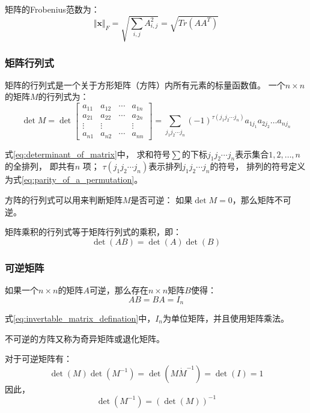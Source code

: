 矩阵的Frobenius范数为：
\begin{equation}
    \label{eq:frobenius_norm}
    \Vert \bm{x} \Vert_{F} =\sqrt{\sum_{i,j}A_{i,j}^{2}}=\sqrt{Tr(AA^{T})}
\end{equation}

\subsubsection{矩阵行列式}
矩阵的行列式是一个关于方形矩阵（方阵）内所有元素的标量函数值。
一个{$n\times n$}的矩阵{$M$}的行列式为：
\begin{equation}
    \label{eq:determinant_of_matrix}
    \det M =\det
    \begin{bmatrix}
        a_{11}&a_{12}&\cdots &a_{1n} \\
        a_{21}&a_{22}&\cdots &a_{2n} \\
        \vdots & \vdots & & \vdots \\
        a_{n1}&a_{n2}&\cdots &a_{nn}
    \end{bmatrix}
    =\sum_{j_1j_2\cdots j_n}{(-1)}^{\tau (j_1j_2\cdots j_n)}a_{1j_1}a_{2j_2}\ldots a_{nj_n}
\end{equation}

式{\ref{eq:determinant_of_matrix}}中，
求和符号{$\sum $}的下标{$j_1j_2\cdots j_n$}表示集合{$1,2,\ldots ,n$}的全排列，
即共有{$n\!$} 项；
{$\tau({j_1j_2\cdots j_n})$}表示排列{$j_1j_2\cdots j_n$}的符号，
排列的符号定义为式{\ref{eq:parity_of_a_permutation}}。

方阵的行列式可以用来判断矩阵{$M$}是否可逆：
如果{$\det M = 0$}，那么矩阵不可逆。

矩阵乘积的行列式等于矩阵行列式的乘积，即：
\begin{equation}
    \det (AB)=\det(A)\det(B)
\end{equation}

\subsubsection{可逆矩阵}
如果一个{$n \times n$}的矩阵{$A$}可逆，那么存在{$n \times n$}矩阵{$B$}使得：
\begin{equation}
    \label{eq:invertable_matrix_defination}
    AB=BA=I_n
\end{equation}

式{\ref{eq:invertable_matrix_defination}}中，{$I_n$}为单位矩阵，并且使用矩阵乘法。

不可逆的方阵又称为奇异矩阵或退化矩阵。

对于可逆矩阵有：
\begin{equation}
    \det(M)\det(M^{-1})=\det(M\dot M^{-1})
    =\det(I)=1
\end{equation}
因此，
\begin{equation}
    \label{eq:determinant_of_inverse_matrix}
    \det (M^{-1})={(\det(M))}^{-1}
\end{equation}




